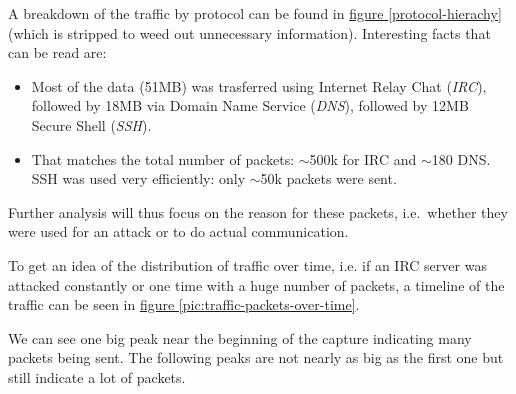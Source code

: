 \documentclass[a4paper,
    11pt,
    normalheadings,
    parindent,
    UKenglish,
    abstracton,
    ]{scrartcl}
\begin{document}
A breakdown of the traffic by protocol can be found in
\hyperref[protocol-hierachy]{figure \ref*{protocol-hierachy}}
(which is stripped to weed out unnecessary information).
Interesting facts that can be read are:
\begin{itemize}
    \item Most of the data (51MB) was trasferred using Internet Relay Chat (\emph{IRC}), followed by 18MB via Domain Name Service (\emph{DNS}), followed by 12MB Secure Shell (\emph{SSH}).
    \item That matches the total number of packets: $\sim$500k for IRC and $\sim$180 DNS. SSH was used very efficiently: only $\sim$50k packets were sent.
\end{itemize}
Further analysis will thus focus on the reason for these  packets, i.e.\, whether they were used for an attack or to do actual communication.


To get an idea of the distribution of traffic over time, i.e. if an IRC server was attacked constantly or one time with a huge number of packets, a timeline of the traffic can be seen in
\hyperref[pic:traffic-packets-over-time]{figure \ref*{pic:traffic-packets-over-time}}.

We can see one big peak near the beginning of the capture indicating many packets being sent.
The following peaks are not nearly as big as the first one but still indicate a lot of packets.
\end{document}
